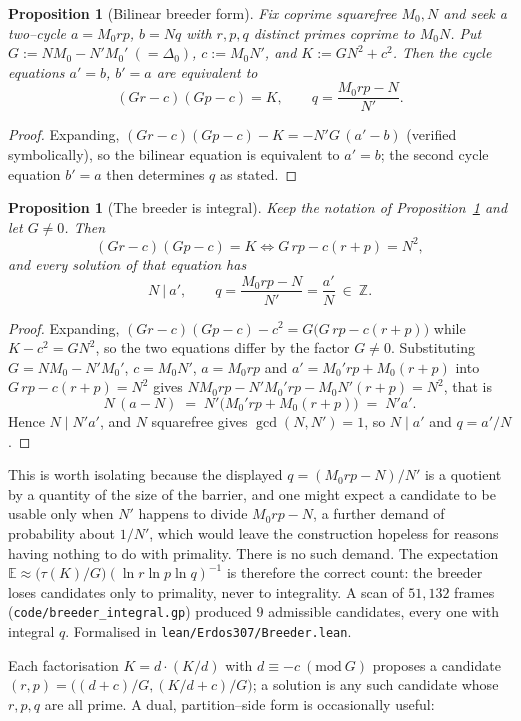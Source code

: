 \documentclass[11pt]{article}
\newtheorem{proposition}[theorem]{Proposition}
\theoremstyle{definition}
\begin{document}
\begin{proposition}[Bilinear breeder form]\label{prop:bde}
Fix coprime squarefree $M_0,N$ and seek a two--cycle $a=M_0rp$, $b=Nq$ with $r,p,q$ distinct primes
coprime to $M_0N$. Put $G:=NM_0-N'M_0'\ (=\Delta_0)$, $c:=M_0N'$, and $K:=GN^2+c^2$. Then the cycle
equations $a'=b$, $b'=a$ are equivalent to
\[
(Gr-c)(Gp-c)=K, \qquad q=\frac{M_0rp-N}{N'}.
\]
\end{proposition}
\begin{proof}
Expanding, $(Gr-c)(Gp-c)-K=-N'G\,(a'-b)$ (verified symbolically), so the bilinear equation is
equivalent to $a'=b$; the second cycle equation $b'=a$ then determines $q$ as stated.
\end{proof}

\begin{proposition}[The breeder is integral]\label{prop:bdeint}
Keep the notation of Proposition~\textup{\ref{prop:bde}} and let $G\ne0$. Then
\[ (Gr-c)(Gp-c)=K \iff G\,rp-c(r+p)=N^{2}, \]
and every solution of that equation has
\[ N\ \big|\ a', \qquad q=\frac{M_0rp-N}{N'}=\frac{a'}{N}\ \in\ \mathbb{Z}. \]
\end{proposition}
\begin{proof}
Expanding, $(Gr-c)(Gp-c)-c^{2}=G\bigl(G\,rp-c(r+p)\bigr)$ while $K-c^{2}=GN^{2}$, so the two
equations differ by the factor $G\ne0$. Substituting $G=NM_0-N'M_0'$, $c=M_0N'$, $a=M_0rp$ and
$a'=M_0'rp+M_0(r+p)$ into $G\,rp-c(r+p)=N^{2}$ gives
$NM_0rp-N'M_0'rp-M_0N'(r+p)=N^{2}$, that is
\[ N\,(a-N)\;=\;N'\bigl(M_0'rp+M_0(r+p)\bigr)\;=\;N'a'. \]
Hence $N\mid N'a'$, and $N$ squarefree gives $\gcd(N,N')=1$, so $N\mid a'$ and $q=a'/N$.
\end{proof}

This is worth isolating because the displayed $q=(M_0rp-N)/N'$ is a quotient by a quantity of the
size of the barrier, and one might expect a candidate to be usable only when $N'$ happens to divide
$M_0rp-N$, a further demand of probability about $1/N'$, which would leave the construction
hopeless for reasons having nothing to do with primality. There is no such demand. The expectation
$\mathbb{E}\approx\bigl(\tau(K)/G\bigr)(\ln r\ln p\ln q)^{-1}$ is therefore the correct count: the
breeder loses candidates only to primality, never to integrality. A scan of $51{,}132$ frames
(\texttt{code/breeder\_integral.gp}) produced $9$ admissible candidates, every one with integral $q$.
Formalised in \texttt{lean/Erdos307/Breeder.lean}.

Each factorisation $K=d\cdot(K/d)$ with $d\equiv-c\ (\mathrm{mod}\ G)$ proposes a candidate
$(r,p)=\bigl((d+c)/G,(K/d+c)/G\bigr)$; a solution is any such candidate whose $r,p,q$ are all prime.
A dual, partition--side form is occasionally useful:
\end{document}
